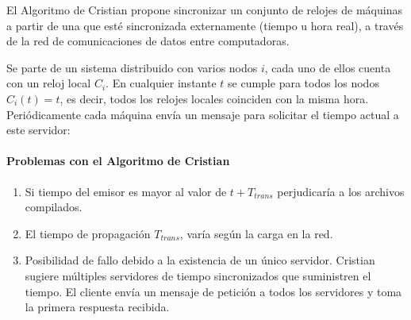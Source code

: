 		El Algoritmo de Cristian   propone sincronizar un conjunto de relojes de 	máquinas a partir de una que esté sincronizada externamente (tiempo u hora real), a través de la red de comunicaciones de datos entre computadoras. 
	
	 Se parte de un sistema distribuido con varios nodos $i$, cada uno de ellos cuenta con un reloj local $C_{i}$. En cualquier instante $t$ se cumple para todos los nodos $C_{i}(t) = t$, es decir, todos los relojes locales coinciden con  la misma hora.   Periódicamente cada máquina envía un mensaje para solicitar el tiempo actual a este servidor:
		
		
		 

\paragraph{Problemas con el Algoritmo de Cristian} 
			\begin{enumerate}
				\item  Si tiempo del emisor es mayor al valor de $t + T_{trans}$ 	 perjudicaría a los archivos compilados.
				\item  El tiempo de propagación $T_{trans}$, varía según la carga en la red.
				\item     Posibilidad de fallo debido a la existencia de un único servidor. Cristian sugiere múltiples servidores de tiempo sincronizados que suministren el tiempo. El cliente envía un mensaje de petición a todos los servidores y toma la primera respuesta recibida.
			\end{enumerate}
		
